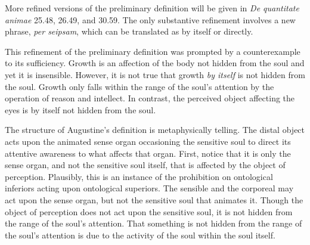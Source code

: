 \documentclass[12pt]{article}
\begin{document}

More refined versions of the preliminary definition will be given in \emph{De quantitate animae} 25.48, 26.49, and 30.59. The only substantive refinement involves a new phrase, \emph{per seipsam}, which can be translated as by itself or directly.

This refinement of the preliminary definition was prompted by a counterexample to its sufficiency. Growth is an affection of the body not hidden from the soul and yet it is insensible. However, it is not true that growth \emph{by itself} is not hidden from the soul. Growth only falls within the range of the soul's attention by the operation of reason and intellect. In contrast, the perceived object affecting the eyes is by itself not hidden from the soul.

The structure of Augustine's definition is metaphysically telling. The distal object acts upon the animated sense organ occasioning the sensitive soul to direct its attentive awareness to what affects that organ. First, notice that it is only the sense organ, and not the sensitive soul itself, that is affected by the object of perception. Plausibly, this is an instance of the prohibition on ontological inferiors acting upon ontological superiors. The sensible and the corporeal may act upon the sense organ, but not the sensitive soul that animates it. Though the object of perception does not act upon the sensitive soul, it is not hidden from the range of the soul's attention. That something is not hidden from the range of the soul’s attention is due to the activity of the soul within the soul itself.

\end{document}
